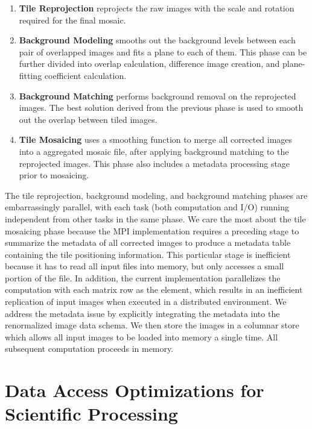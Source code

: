 \documentclass{sig-alternate}
\begin{document}
\begin{enumerate}
\item \textbf{Tile Reprojection} reprojects the raw images with the scale and rotation required for the
final mosaic. 
\item \textbf{Background Modeling} smooths out the background levels between each pair of
overlapped images and fits a plane to each of them. This phase can be further divided into overlap
calculation, difference image creation, and plane-fitting coefficient calculation.
\item \textbf{Background Matching} performs background \linebreak removal on the
reprojected images. The best solution derived from the previous phase is used to smooth out the overlap between
tiled images.
\item \textbf{Tile Mosaicing} uses a smoothing function to merge all corrected images into a aggregated mosaic file,
after applying background matching to the reprojected images. This phase also includes a metadata processing
stage prior to mosaicing.
\end{enumerate}

The tile reprojection, background modeling, and background matching phases are embarrassingly
parallel, with each task (both computation and I/O) running independent from other tasks in the same
phase. We care the most about the tile mosaicing phase because the MPI implementation requires a preceding
stage to summarize the metadata of all corrected images to produce a metadata table containing the tile
positioning information. This particular stage is inefficient because it has to read all input files into memory, but
only accesses a small portion of the file. In addition, the current implementation parallelizes the computation with
each matrix row as the element, which results in an inefficient replication of input images when executed in a
distributed environment. We address the metadata issue by explicitly integrating the metadata into the
renormalized image data schema. We then store the images in a columnar store which allows all input images to
be loaded into memory a single time. All subsequent computation proceeds in memory.

\section{Data Access Optimizations for \\ Scientific Processing}
\label{sec:optimizations-scientific-processing}
\end{document}
